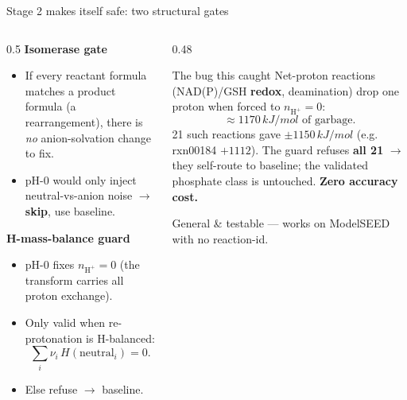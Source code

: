 \documentclass[aspectratio=169,11pt]{beamer}
\newcommand{\kj}{\,kJ/mol}
\newcommand{\arw}{$\rightarrow$}
\begin{document}
\begin{frame}{Stage 2 makes itself safe: two structural gates}
  \begin{columns}[T]
    \begin{column}{0.5\textwidth}
      \textbf{Isomerase gate}
      \begin{itemize}\footnotesize
        \item If every reactant formula matches a product formula (a rearrangement), there is
        \emph{no} anion-solvation change to fix.
        \item pH-0 would only inject neutral-vs-anion noise \arw{} \textbf{skip}, use baseline.
      \end{itemize}
      \vspace{0.6em}
      \textbf{H-mass-balance guard}
      \begin{itemize}\footnotesize
        \item pH-0 fixes $n_{\mathrm{H^+}}{=}0$ (the transform carries all proton exchange).
        \item Only valid when re-protonation is H-balanced:
        \[ \textstyle\sum_i \nu_i\, H(\text{neutral}_i) = 0. \]
        \item Else refuse \arw{} baseline.
      \end{itemize}
    \end{column}
    \begin{column}{0.48\textwidth}
      \begin{alertblock}{The bug this caught}
        \footnotesize Net-proton reactions (NAD(P)/GSH \textbf{redox}, deamination) drop one
        proton when forced to $n_{\mathrm{H^+}}{=}0$:
        \[ \approx 1170\kj \text{ of garbage.} \]
        21 such reactions gave $\pm1150\kj$ (e.g. rxn00184 $+1112$).
        The guard refuses \textbf{all 21} \arw{} they self-route to baseline;
        the validated phosphate class is untouched. \textbf{Zero accuracy cost.}
      \end{alertblock}
      {\scriptsize General \& testable — works on ModelSEED with no reaction-id.}
    \end{column}
  \end{columns}
\end{frame}
\end{document}
